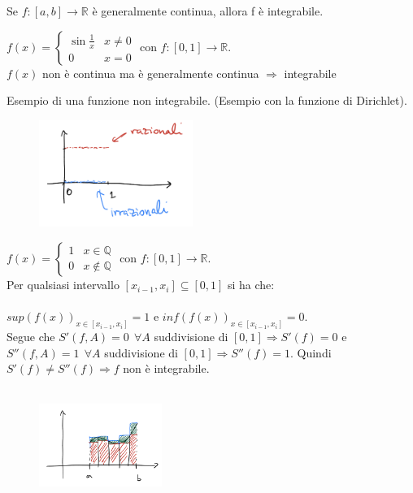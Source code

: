 \begin{theorem}
Se $f:[a,b] \to \mathbb{R}$ è generalmente continua, allora f è integrabile.
\end{theorem}

\begin{example}
$f(x) = \begin{cases}\sin\frac{1}{x} & x\neq 0 \\ 0 & x=0\end{cases}$ con $f: [0,1] \to \mathbb{R}$.\\
$f(x)$ non è continua ma è generalmente continua $\Longrightarrow$ integrabile
\end{example}

\begin{example}
Esempio di una funzione non integrabile. (Esempio con la funzione di Dirichlet).
\end{example}
\begin{figure}
    \vspace{-25pt}
    \centering
    \includegraphics[width=5cm]{images/funzione-dirichlet.png}
\end{figure}
$f(x) = \begin{cases}1 & x\in\mathbb{Q} \\ 0 & x \notin \mathbb{Q} \end{cases}$ con $f: [0,1] \to \mathbb{R}$.\\
Per qualsiasi intervallo $[x_{i-1}, x_i] \subseteq [0,1]$ si ha che:\\\\
$sup(f(x))_{x \in [x_{i-1}, x_i]} = 1$ e $inf(f(x))_{x \in [x_{i-1}, x_i]} = 0$. \\
Segue che $S'(f,A) = 0 \:\: \forall A$ suddivisione di $[0,1] \Longrightarrow S'(f) = 0$ e $S''(f,A) = 1 \:\: \forall A $ suddivisione di $[0,1] \Longrightarrow S''(f) = 1$. Quindi $S'(f) \neq S''(f) \Longrightarrow f$ non è integrabile.\\\\

\begin{figure}
    \vspace{-30pt}
    \centering
    \includegraphics[width=4cm]{images/differenze-aree-integrale.png}
\end{figure}

